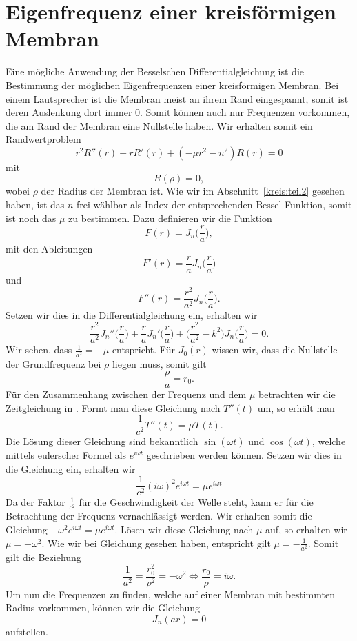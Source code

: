 \section[Eigenfrequenzen einer kreisförmigen Membram]{Eigenfrequenz einer kreisförmigen Membran}

Eine mögliche Anwendung der Besselschen Differentialgleichung ist die Bestimmung der möglichen Eigenfrequenzen einer kreisförmigen Membran. 
Bei einem Lautsprecher ist die Membran meist an ihrem Rand eingespannt, somit ist deren Auslenkung dort immer 0. Somit können auch nur Frequenzen vorkommen, die am Rand der Membran eine Nullstelle haben. Wir erhalten somit ein Randwertproblem
\begin{equation}
r^2 R''(r) + r R'(r) + (-\mu r^2 - n^2)R(r) = 0
\label{eq:dglmitmu}
\end{equation}
mit 
\[
R(\rho) = 0,
\]
wobei $\rho$ der Radius der Membran ist.
Wie wir im Abschnitt~\ref{kreis:teil2} gesehen haben, ist das $n$ frei wählbar als Index der entsprechenden Bessel-Funktion, somit ist noch das $\mu$ zu bestimmen. 
Dazu definieren wir die Funktion
\[
F(r) = J_n \biggl(\frac{r}{a} \biggr),
\]
mit den Ableitungen
\[
F'(r) = \frac{r}{a} J_n \biggl(\frac{r}{a} \biggr)
\]
und 
\[
F''(r) = \frac{r^2}{a^2} J_n \biggl(\frac{r}{a} \biggr).
\]
Setzen wir dies in die Differentialgleichung  ein, erhalten wir
\begin{equation}
\frac{r^2}{a^2}J_n''\biggl(\frac{r}{a} \biggr) +
\frac{r}{a}J_n'\biggl(\frac{r}{a} \biggr) +
\biggl(\frac{r^2}{a^2} - k^2\biggr)J_n\biggl(\frac{r}{a}\biggr) = 0.
\label{eq:dglmitfaktor}
\end{equation}
Wir sehen, dass $\frac{1}{a^2}=-\mu$ entspricht.
Für $J_0(r)$ wissen wir, dass die Nullstelle der Grundfrequenz bei $\rho$ liegen muss, somit gilt
\[
\frac{\rho}{a} = r_0.
\]
Für den  Zusammenhang zwischen der Frequenz und dem $\mu$ betrachten wir die Zeitgleichung in . Formt man diese Gleichung nach $T''(t)$ um, so erhält man 
\[
\frac{1}{c^2} T''(t) = \mu T(t).
\]
Die Lösung dieser Gleichung sind bekanntlich $\sin(\omega t)$ und $\cos(\omega t)$, welche mittels eulerscher Formel als $e^{i\omega t}$ geschrieben werden können.
Setzen wir dies in die Gleichung ein, erhalten wir
\[
\frac{1}{c^2}(i\omega)^2 e^{i\omega t} = \mu e^{i\omega t}
\]
Da der Faktor $\frac{1}{c^2}$ für die Geschwindigkeit der Welle steht, kann er für die Betrachtung der Frequenz vernachlässigt werden. Wir erhalten somit die Gleichung
$
-\omega^2 e^{i\omega t} = \mu e^{i\omega t}.
$
Lösen wir diese Gleichung nach $\mu$ auf, so erhalten wir
$
\mu = -\omega^2
$.
Wie wir bei Gleichung  gesehen haben, entspricht gilt $\mu = -\frac{1}{a^2}$. Somit gilt die Beziehung
\[
\frac{1}{a^2} = \frac{r_0^2}{\rho^2} = -\omega^2
\Leftrightarrow
\frac{r_0}{\rho} = i\omega.
\]
Um nun die Frequenzen zu finden, welche auf einer Membran mit bestimmten Radius vorkommen, können wir die Gleichung
\[
J_n(ar) = 0
\]
aufstellen.

